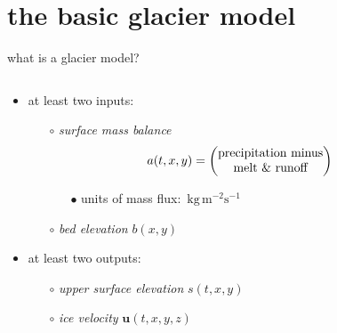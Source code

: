 \documentclass[svgnames,
               hyperref={colorlinks,citecolor=DeepPink4,linkcolor=FireBrick,urlcolor=Maroon},
               usepdftitle=false]  %
               {beamer}
\newcommand{\bu}{\mathbf{u}}
\begin{document}

\section{the basic glacier model}

\begin{frame}{what is a glacier model?}

\begin{columns}
\begin{column}{0.6\textwidth}
\begin{itemize}
\begin{definition}
a \alert{glacier} or \alert{ice sheet model} is a \underline{map}

which evolves a glacier in a climate
\end{definition} 
\item at least two inputs:
    \begin{itemize}
    \item[$\circ$] \emph{surface mass balance}
$$\hspace{-7mm} a(t,x,y) = \begin{pmatrix}
\text{precipitation minus} \\
\text{melt \& runoff}
\end{pmatrix}$$

\vspace{-3mm}
        \begin{itemize}
        \item[{\scriptsize $\bullet$}] units of mass flux:\, $\text{kg}\, \text{m}^{-2} \text{s}^{-1}$
        \end{itemize}

    \item[$\circ$] \emph{bed elevation} $b(x,y)$
    \end{itemize}
\item at least two outputs:
    \begin{itemize}
    \item[$\circ$] \emph{upper surface elevation} $s(t,x,y)$
    \item[$\circ$] \emph{ice velocity} $\bu(t,x,y,z)$
    \end{itemize}


\end{itemize}
\end{column}
\end{columns}
\end{frame}
\end{document}
